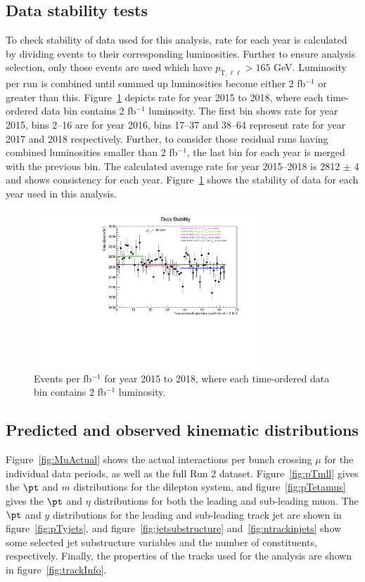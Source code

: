 \subsection{Data stability tests}
\label{sec:data-stability}
To check stability of data used for this analysis, rate for each year is calculated by dividing events to their corresponding luminosities. Further to ensure analysis selection, only those events are used which have $p_{\text{T},\ell\ell}>165$ GeV. Luminosity per run is combined until summed up luminosities become either 2 fb$^{-1}$ or greater than this. Figure~\ref{fig:DataStability} depicts rate for year 2015 to 2018, where each time-ordered data bin contains 2 fb$^{-1}$ luminosity. The first bin shows rate for year 2015, bins 2--16 are for year 2016, bins 17--37 and 38--64 represent rate for year 2017 and 2018 respectively. Further, to consider those residual runs having combined luminosities smaller than 2 fb$^{-1}$, the last bin for each year is merged with the previous bin. The calculated average rate for year 2015--2018 is 2812 $\pm$ 4 and shows consistency for each year. Figure~\ref{fig:DataStability} shows the stability of data for each year used in this analysis.
\begin{figure}[h!]
	\centering
	\includegraphics[width=0.75\textwidth]{figures/DataStability.pdf}
	\caption{Events per fb$^{-1}$ for year 2015 to 2018, where each time-ordered data bin contains 2 fb$^{-1}$ luminosity.}
	\label{fig:DataStability}
\end{figure}

\subsection{Predicted and observed kinematic distributions}
\label{sec:datamc}
Figure~\ref{fig:MuActual} shows the actual interactions per bunch crossing $\mu$ for the individual data periods, as well as the full Run 2 dataset.
Figure~\ref{fig:pTmll} gives the $\pt$ and $m$ distributions for the dilepton system, and figure~\ref{fig:pTetamus} gives the $\pt$ and $\eta$ distributions for both the leading and sub-leading muon.
The $\pt$ and $y$ distributions for the leading and sub-leading track jet are shown in figure~\ref{fig:pTyjets}, and figure~\ref{fig:jetsubstructure} and~\ref{fig:ntrackinjets} show some
selected jet substructure variables and the number of constituents, respectively. Finally, the properties of the tracks used for the analysis are shown in figure~\ref{fig:trackInfo}.


